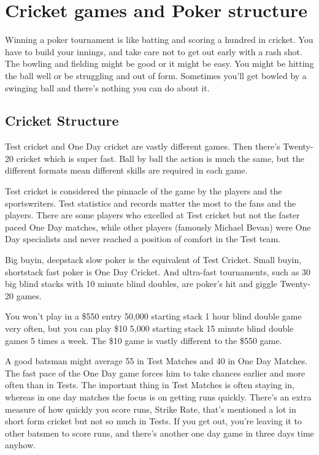 \chapter{Cricket games and Poker structure}


Winning a poker tournament is like batting and scoring a hundred in cricket.
You have to build your innings, and take care not to get out early
with a rash shot. The bowling and fielding might be good or it might 
be easy. You might be hitting the ball well or be struggling and out
of form. Sometimes you'll get bowled by a swinging ball and
there's nothing you can do about it.  

\section{Cricket Structure}

Test cricket and One Day cricket are vastly different games. Then
there's Twenty-20 cricket which is super fast. Ball by ball the
action is much the same, but the different formats mean
different skills are required in each game.

Test cricket is considered the pinnacle of the game by the players
and the sportswriters. Test statistics and records
matter the most to the fans and the players. There are some players who excelled
at Test cricket but not the faster paced One Day matches, while
other players (famously Michael Bevan) were One Day
specialists and never reached a position of comfort in the Test team.

Big buyin, deepstack slow poker is the equivalent of Test Cricket. 
Small buyin, shortstack fast poker is One Day Cricket.
And ultra-fast tournaments, such as 30 big blind stacks with 10 minute
blind doubles, are poker's hit and giggle Twenty-20 games.

You won't play in a \$550 entry 50,000 starting stack 1 hour blind double
game very often, but you can play \$10 5,000 starting stack 15 minute
blind double games 5 times a week. The \$10 game is vastly
different to the \$550 game. 

A good batsman might average 55 in Test Matches and 40 in One Day
Matches. The fast pace of the One Day game forces him to take
chances earlier and more often than in Tests. The important thing in
Test Matches is often staying in, whereas in one day matches
the focus is on getting runs quickly. There's an extra
measure of how quickly you score runs, Strike Rate, that's mentioned
a lot in short form cricket but not so much in Tests. If you get out, 
you're leaving it to other batsmen to score runs, and there's another 
one day game in three days time anyhow.

